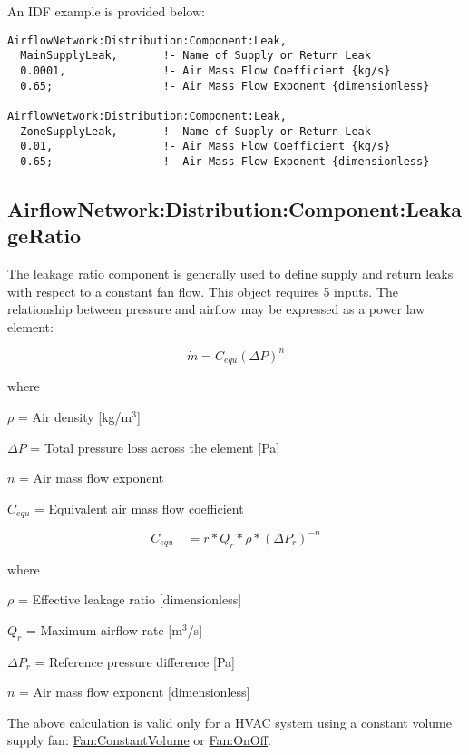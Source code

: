 An IDF example is provided below:

\begin{lstlisting}
AirflowNetwork:Distribution:Component:Leak,
  MainSupplyLeak,       !- Name of Supply or Return Leak
  0.0001,               !- Air Mass Flow Coefficient {kg/s}
  0.65;                 !- Air Mass Flow Exponent {dimensionless}

AirflowNetwork:Distribution:Component:Leak,
  ZoneSupplyLeak,       !- Name of Supply or Return Leak
  0.01,                 !- Air Mass Flow Coefficient {kg/s}
  0.65;                 !- Air Mass Flow Exponent {dimensionless}
\end{lstlisting}

\subsection{AirflowNetwork:Distribution:Component:LeakageRatio}\label{airflownetworkdistributioncomponentleakageratio}

The leakage ratio component is generally used to define supply and return leaks with respect to a constant fan flow. This object requires 5 inputs. The relationship between pressure and airflow may be expressed as a power law element:

\begin{equation}
\dot m = {C_{equ}}{\left( {\Delta P} \right)^n}
\end{equation}

where

\(\rho\) = Air density {[}kg/m\(^{3}\){]}

\(\Delta P\) = Total pressure loss across the element {[}Pa{]}

\(n\) = Air mass flow exponent

\(C_{equ}\) = Equivalent air mass flow coefficient

\begin{equation}
{C_{equ}}\,\,\,\,\,\, = r*{Q_r}*\rho *{\left( {\Delta {P_r}} \right)^{ - n}}
\end{equation}

where

\(\rho\) = Effective leakage ratio {[}dimensionless{]}

\(Q_{r}\) = Maximum airflow rate {[}m\(^{3}\)/s{]}

\(\Delta {P_r}\) = Reference pressure difference {[}Pa{]}

\(n\) = Air mass flow exponent {[}dimensionless{]}

The above calculation is valid only for a HVAC system using a constant volume supply fan: \hyperref[fanconstantvolume]{Fan:ConstantVolume} or \hyperref[fanonoff]{Fan:OnOff}.

